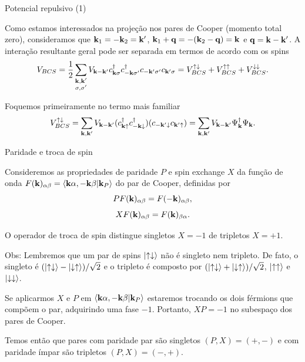 \documentclass[8pt,aspectratio=169,xcolor={table,dvipsnames,usenames}]{beamer}
\begin{document}
\begin{frame}{Potencial repulsivo (1)}

Como estamos interessados na projeção nos pares de Cooper (momento total zero), consideramos que $\vb{k}_1 = -\vb{k}_2 = \vb{k}'$, $\vb{k}_1 + \vb{q} = -(\vb{k}_2 - \vb{q}) = \vb{k}$ e $\vb{q} = \vb{k} - \vb{k}'$. A interação resultante geral pode ser separada em termos de acordo com os spins
$$
V_{BCS} = \frac{1}{2} \sum_{\substack{\vb{k},\vb{k}' \\ \sigma, \sigma'}} V_{\vb{k}-\vb{k}'} c_{\vb{k}\sigma}^\dagger c_{-\vb{k}\sigma'}^\dagger c_{-\vb{k}'\sigma'}c_{\vb{k}'\sigma} =
V_{BCS}^{\uparrow\downarrow} + V_{BCS}^{\uparrow\uparrow} + V_{BCS}^{\downarrow\downarrow}.
$$

Foquemos primeiramente no termo mais familiar
$$
V_{BCS}^{\uparrow\downarrow} = \sum_{\vb{k},\vb{k}'} V_{\vb{k}-\vb{k}'} (c_{\vb{k}\uparrow}^\dagger c_{-\vb{k}\downarrow}^\dagger) (c_{-\vb{k}'\downarrow} c_{\vb{k}'\uparrow}) =
\sum_{\vb{k},\vb{k}'} V_{\vb{k}-\vb{k}'} \Psi_{\vb{k}}^\dagger \Psi_{\vb{k}}.
$$

\end{frame}



\begin{frame}{Paridade e troca de spin}

Consideremos as propriedades de paridade $P$ e spin exchange $X$ da função de onda $F(\vb{k})_{\alpha\beta} = \braket{\vb{k}\alpha,-\vb{k}\beta}{\vb{k}_P}$ do par de Cooper, definidas por
$$
P F(\vb{k})_{\alpha\beta} = F(-\vb{k})_{\alpha\beta},
$$
$$
X F(\vb{k})_{\alpha\beta} = F(\vb{k})_{\beta\alpha}.
$$

O operador de troca de spin distingue singletos $X = -1$ de tripletos $X = +1$.

\n

Obs: Lembremos que um par de spins $\ket{\uparrow\downarrow}$ não é singleto nem tripleto. De fato, o singleto é $(\ket{\uparrow\downarrow} - \ket{\downarrow\uparrow})/\sqrt{2}$ e o tripleto é composto por $(\ket{\uparrow\downarrow} + \ket{\downarrow\uparrow})/\sqrt{2}$, $\ket{\uparrow\uparrow}$ e $\ket{\downarrow\downarrow}$.

\n

Se aplicarmos $X$ e $P$ em $\braket{\vb{k}\alpha,-\vb{k}\beta}{\vb{k}_P}$ estaremos trocando os dois férmions que compõem o par, adquirindo uma fase $-1$. Portanto, $XP = -1$ no subespaço dos pares de Cooper.

\n

Temos então que pares com paridade par são singletos $(P,X) = (+, -)$ e com paridade ímpar são tripletos $(P,X) = (-,+)$.

\end{frame}
\end{document}
